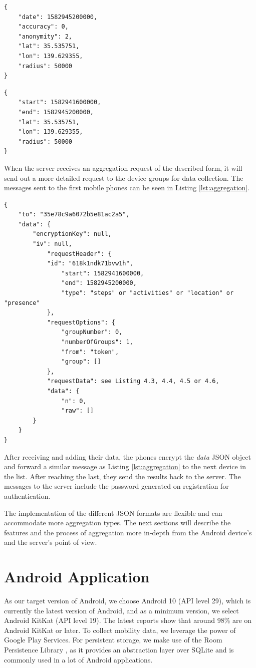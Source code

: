 \begin{lstlisting}[caption=Search options for locations, label={lst:locations}]
{
    "date": 1582945200000,
    "accuracy": 0,
    "anonymity": 2,
    "lat": 35.535751,
    "lon": 139.629355,
    "radius": 50000
}
\end{lstlisting}

\begin{lstlisting}[caption=Search options for presence, label={lst:presence}]
{
    "start": 1582941600000,
    "end": 1582945200000,
    "lat": 35.535751,
    "lon": 139.629355,
    "radius": 50000
}
\end{lstlisting}


When the server receives an aggregation request of the described form, it will send out a more detailed request to the device groups for data collection. The messages sent to the first mobile phones can be seen in Listing \ref{lst:aggregation}.

\begin{lstlisting}[caption=First aggregation request sent to the groups, label={lst:aggregation}]
{
    "to": "35e78c9a6072b5e81ac2a5",
    "data": {
        "encryptionKey": null,
        "iv": null,
            "requestHeader": {
            "id": "618k1ndk71bvw1h",
                "start": 1582941600000,
                "end": 1582945200000,
                "type": "steps" or "activities" or "location" or "presence"
            },
            "requestOptions": {
                "groupNumber": 0,
                "numberOfGroups": 1,
                "from": "token",
                "group": []
            },
            "requestData": see Listing 4.3, 4.4, 4.5 or 4.6,
            "data": {
                "n": 0,
                "raw": []
        }
    }
}
\end{lstlisting}

After receiving and adding their data, the phones encrypt the \textit{data} JSON object and forward a similar message as Listing \ref{lst:aggregation} to the next device in the list. After reaching the last, they send the results back to the server. The messages to the server include the password generated on registration for authentication.

The implementation of the different JSON formats are flexible and can accommodate more aggregation types. The next sections will describe the features and the process of aggregation more in-depth from the Android device's and the server's point of view.

\section{Android Application}
As our target version of Android, we choose Android 10 (API level 29), which is currently the latest version of Android, and as a minimum version, we select Android KitKat (API level 19). The latest reports \cite{android3}\cite{android4} show that around 98\% are on Android KitKat or later. To collect mobility data, we leverage the power of Google Play Services. For persistent storage, we make use of the Room Persistence Library \cite{room}, as it provides an abstraction layer over SQLite and is commonly used in a lot of Android applications.

